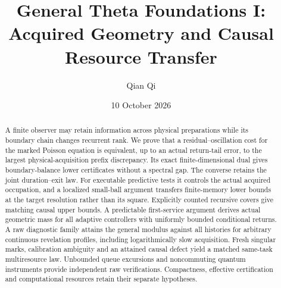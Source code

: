 \documentclass[11pt]{amsart}
\title[General Theta Foundations I]{General Theta Foundations I:\\Acquired Geometry and Causal Resource Transfer}
\author{Qian Qi}
\date{10 October 2026}
\theoremstyle{definition}\newtheorem{definition}[theorem]{Definition}
\theoremstyle{remark}\newtheorem{remark}[theorem]{Remark}
\begin{document}
\begin{abstract}
A finite observer may retain information across physical preparations while its boundary chain changes recurrent rank. We prove that a residual--oscillation cost for the marked Poisson equation is equivalent, up to an actual return-tail error, to the largest physical-acquisition prefix discrepancy. Its exact finite-dimensional dual gives boundary-balance lower certificates without a spectral gap. The converse retains the joint duration--exit law. For executable predictive tests it controls the actual acquired occupation, and a localized small-ball argument transfers finite-memory lower bounds at the target resolution rather than its square. Explicitly counted recursive covers give matching causal upper bounds. A predictable first-service argument derives actual geometric mass for all adaptive controllers with uniformly bounded conditional returns. A raw diagnostic family attains the general modulus against all histories for arbitrary continuous revelation profiles, including logarithmically slow acquisition. Fresh singular marks, calibration ambiguity and an attained causal defect yield a matched same-task multiresource law. Unbounded queue excursions and noncommuting quantum instruments provide independent raw verifications. Compactness, effective certification and computational resources retain their separate hypotheses.
\end{abstract}
\maketitle













\end{document}
